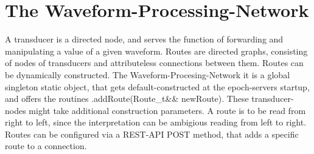 \chapter{The Waveform-Processing-Network}
\label{chap:WaveformProcessingNetwork}
A transducer is a directed node, and serves the function of forwarding and manipulating a value of a given waveform.
Routes are directed graphs, consisting of nodes of transducers and attributeless connections between them.
Routes can be dynamically constructed. 
The Waveform-Procesing-Network it is a global singleton static object, that gets default-constructed at the epoch-servers startup, and offers the routines .addRoute(Route\_t\&\& newRoute).
These transducer-nodes might take additional construction parameters. 
A route is to be read from right to left, since the interpretation can be ambigious reading from left to right. 
Routes can be configured via a REST-API POST method, that adds a specific route to a connection. 